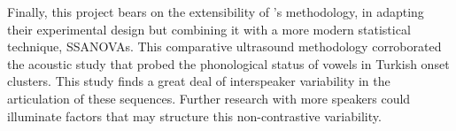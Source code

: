 \documentclass[output=paper,colorlinks,citecolor=brown]{langscibook}
\begin{document}
Finally, this project bears on the extensibility of \citet{DavidsonStone2003}'s methodology, in adapting their experimental design but combining it with a more modern statistical technique, SSANOVAs. This comparative ultrasound methodology corroborated the acoustic study that probed the phonological status of vowels in Turkish onset clusters. This study finds a great deal of interspeaker variability in the articulation of these sequences. Further research with more speakers could illuminate factors that may structure this non-contrastive variability.


{\sloppy\printbibliography[heading=subbibliography,notkeyword=this]}
\end{document}
